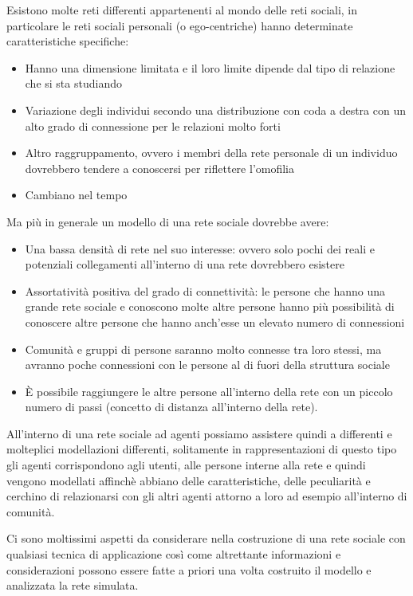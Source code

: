 Esistono molte reti differenti appartenenti al mondo delle reti sociali, in particolare le reti sociali personali (o ego-centriche) hanno determinate caratteristiche specifiche:
\begin{itemize}
    \item Hanno una dimensione limitata e il loro limite dipende dal tipo di relazione che si sta studiando
    \item Variazione degli individui secondo una distribuzione con coda a destra con un alto grado di connessione per le relazioni molto forti
    \item Altro raggruppamento, ovvero i membri della rete personale di un individuo dovrebbero tendere a conoscersi per riflettere l'omofilia
    \item Cambiano nel tempo
\end{itemize}

Ma più in generale un modello di una rete sociale dovrebbe avere:
\begin{itemize}
    \item Una bassa densità di rete nel suo interesse: ovvero solo pochi dei reali e potenziali collegamenti all'interno di una rete dovrebbero esistere
    \item Assortatività positiva del grado di connettività: le persone che hanno una grande rete sociale e conoscono molte altre persone hanno più possibilità di conoscere altre persone che hanno anch'esse un elevato numero di connessioni
    \item Comunità e gruppi di persone saranno molto connesse tra loro stessi, ma avranno poche connessioni con le persone al di fuori della struttura sociale 
    \item È possibile raggiungere le altre persone all'interno della rete con un piccolo numero di passi (concetto di distanza all'interno della rete).
\end{itemize}

All'interno di una rete sociale ad agenti possiamo assistere quindi a differenti e molteplici modellazioni differenti, solitamente in rappresentazioni di questo tipo gli agenti corrispondono agli utenti, alle persone interne alla rete e quindi vengono modellati affinchè abbiano delle caratteristiche, delle peculiarità e cerchino di relazionarsi con gli altri agenti attorno a loro ad esempio all'interno di comunità.

Ci sono moltissimi aspetti da considerare nella costruzione di una rete sociale con qualsiasi tecnica di applicazione così come altrettante informazioni e considerazioni possono essere fatte a priori una volta costruito il modello e analizzata la rete simulata.

